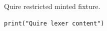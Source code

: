 \documentclass{article}
\begin{document}
Quire restricted minted fixture.
\begin{verbatim}
print("Quire lexer content")
\end{verbatim}
\end{document}
